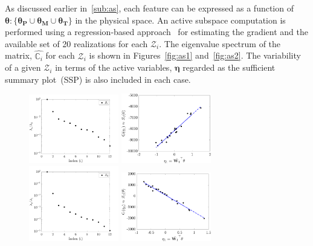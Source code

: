 As discussed earlier in~\ref{sub:as}, each feature can be expressed as a function of 
$\bm{\theta}:\{\bm{\theta_P}\cup\bm{\theta_M}\cup\bm{\theta_T}\}$ in the physical
space. An active subspace computation
is performed using a regression-based approach~\cite{Constantine:2015, Vohra:2019}
for estimating the gradient and the available set of 20 realizations for each $\mathcal{Z}_i$. 
The eigenvalue spectrum of the matrix, $\hat{\mathbb{C}_i}$ for each $\mathcal{Z}_i$ is shown in Figures~\ref{fig:as1}
and~\ref{fig:as2}.
The variability of a given $\mathcal{Z}_i$ in terms of the active variables, $\bm{\eta}$ regarded as the sufficient summary
plot~(SSP) is also included in each case.
%
\begin{figure}[htbp]
\begin{center}
\includegraphics[width=0.35\textwidth]{./Figures/eig_Zf1} 
\includegraphics[width=0.35\textwidth]{./Figures/SSP_Zf1} 
\\
\includegraphics[width=0.35\textwidth]{./Figures/eig_Zf2} 
\includegraphics[width=0.35\textwidth]{./Figures/SSP_Zf2} 

\end{center}
\end{figure}
